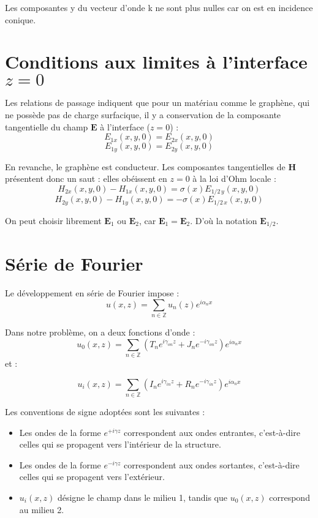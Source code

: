 \documentclass{article}
\begin{document}
Les composantes y du vecteur d'onde k ne sont plus nulles car on est en incidence conique.
\section*{Conditions aux limites à l'interface $z = 0$}

Les relations de passage indiquent que pour un matériau comme le graphène, qui ne possède pas de charge surfacique, il y a conservation de la composante tangentielle du champ $\mathbf{E}$ à l'interface ($z = 0$) :
\[
E_{1x}(x, y, 0) = E_{2x}(x, y, 0)
\]
\[
E_{1y}(x, y, 0) = E_{2y}(x, y, 0)
\]

En revanche, le graphène est conducteur. Les composantes tangentielles de $\mathbf{H}$ présentent donc un saut : elles obéissent en $z = 0$ à la loi d'Ohm locale :
\[
H_{2x}(x, y, 0) - H_{1x}(x, y, 0) = \sigma(x) E_{1/2\, y}(x, y, 0)
\]
\[
H_{2y}(x, y, 0) - H_{1y}(x, y, 0) = -\sigma(x)  E_{1/2\, x}(x, y, 0)
\]

On peut choisir librement $\mathbf{E}_1$ ou $\mathbf{E}_2$, car $\mathbf{E}_1 = \mathbf{E}_2$. D'où la notation $\mathbf{E}_{1/2}$.

\section*{Série de Fourier}

Le développement en série de Fourier impose :
\[
u(x, z) = \sum_{n \in \mathbb{Z}} u_n(z) e^{i \alpha_n x}
\]

Dans notre problème, on a deux fonctions d'onde :
\[
u_0(x, z) = \sum_{n \in \mathbb{Z}} \left( T_n e^{i \gamma_{on} z} + J_n e^{-i \gamma_{on} z} \right) e^{i \alpha_n x}
\]
et :

\[
u_i(x, z) = \sum_{n \in \mathbb{Z}} \left( I_n e^{i \gamma_{in} z} + R_n e^{-i \gamma_{in} z} \right) e^{i \alpha_n x}
\]

Les conventions de signe adoptées sont les suivantes :
\begin{itemize}
  \item Les ondes de la forme \( e^{+i \gamma z} \) correspondent aux ondes entrantes, c’est-à-dire celles qui se propagent vers l’intérieur de la structure.
  \item Les ondes de la forme \( e^{-i \gamma z} \) correspondent aux ondes sortantes, c’est-à-dire celles qui se propagent vers l’extérieur.
  \item \( u_i(x,z) \) désigne le champ dans le milieu 1, tandis que \( u_0(x,z) \) correspond au milieu 2.
\end{itemize}
\end{document}
